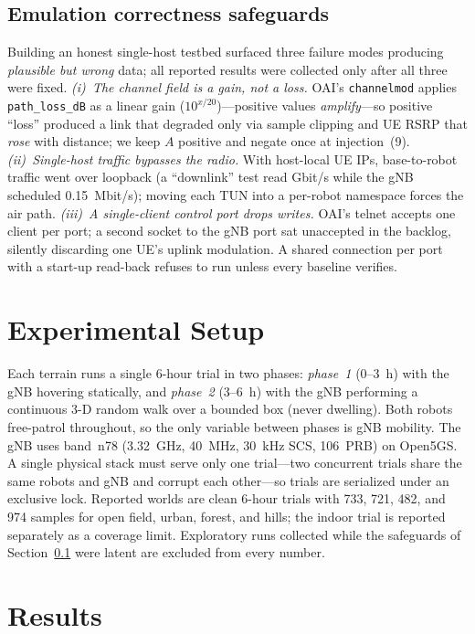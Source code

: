 \documentclass[10pt, conference]{IEEEtran}
\begin{document}
\subsection{Emulation correctness safeguards}
\label{sec:pitfalls}
Building an honest single-host testbed surfaced three failure modes producing
\emph{plausible but wrong} data; all reported results were collected only after all
three were fixed. \emph{(i)~The channel field is a gain, not a loss.} OAI's
\texttt{channelmod} applies \texttt{path\_loss\_dB} as a linear gain
($10^{x/20}$)---positive values \emph{amplify}---so positive ``loss'' produced a
link that degraded only via sample clipping and UE RSRP that \emph{rose} with
distance; we keep $A$ positive and negate once at injection~(9).
\emph{(ii)~Single-host traffic bypasses the radio.} With host-local UE IPs,
base-to-robot traffic went over loopback (a ``downlink'' test read Gbit/s while the
gNB scheduled 0.15~Mbit/s); moving each TUN into a per-robot namespace forces the
air path. \emph{(iii)~A single-client control port drops writes.} OAI's telnet
accepts one client per port; a second socket to the gNB port sat unaccepted in the
backlog, silently discarding one UE's uplink modulation. A shared connection per
port with a start-up read-back refuses to run unless every baseline verifies.

\section{Experimental Setup}
\label{sec:setup}
Each terrain runs a single 6-hour trial in two phases: \emph{phase~1} (0--3~h) with
the gNB hovering statically, and \emph{phase~2} (3--6~h) with the gNB performing a
continuous 3-D random walk over a bounded box (never dwelling). Both robots
free-patrol throughout, so the only variable between phases is gNB mobility. The
gNB uses band~n78 (3.32~GHz, 40~MHz, 30~kHz SCS, 106~PRB) on Open5GS. A single
physical stack must serve only one trial---two concurrent trials share the same
robots and gNB and corrupt each other---so trials are serialized under an exclusive
lock. Reported worlds are clean 6-hour trials with 733, 721, 482, and 974 samples
for open field, urban, forest, and hills; the indoor trial is reported separately
as a coverage limit. Exploratory runs collected while the safeguards of
Section~\ref{sec:pitfalls} were latent are excluded from every number.

\section{Results}
\label{sec:results}
\end{document}
